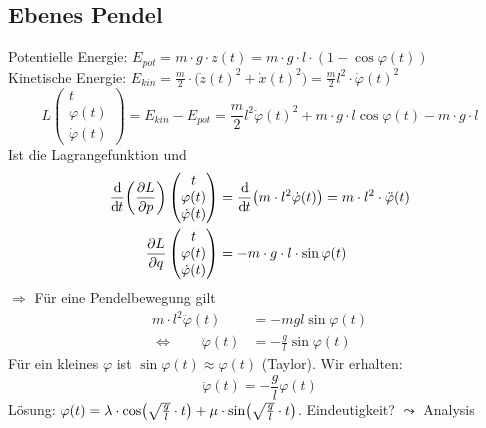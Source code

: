 \subsection{Ebenes Pendel} %
\label{sub:103}
\begin{figure}[h]
\end{figure}
Potentielle Energie: $E_{pot} = m \cdot g \cdot z(t) = m \cdot g \cdot l \cdot (1-\cos \varphi(t))$  \\
Kinetische Energie: $E_{kin} = \frac{m}{2} \cdot  \big( \dot z(t)^2 + \dot x(t)^2 \big) = \frac{m}{2} l^2 \cdot \dot \varphi(t)^2$
\[
	L \begin{pmatrix}
		t \\ \varphi(t) \\ \dot \varphi(t)
	\end{pmatrix} = E_{kin} - E_{pot} = \frac{m}{2} l^2 \dot \varphi(t)^2 + m \cdot g \cdot l \cos \varphi(t) - m \cdot g \cdot l
\]
Ist die Lagrangefunktion und 
\begin{align*}
	\diffd{}{t}  \enbrace*{ \diff{L}{p} } \begin{pmatrix}
		t \\ \varphi(t) \\ \dot \varphi(t)
	\end{pmatrix} &= \diffd{}{t} \enbrace*{m \cdot l ^2 \dot \varphi(t)} = m \cdot l^2 \cdot  \ddot \varphi(t) \\
	\diff{L}{q} \begin{pmatrix}
		t \\ \varphi(t) \\ \dot \varphi(t)
	\end{pmatrix} &= - m \cdot g \cdot l \cdot \sin \varphi(t)
\end{align*}
$\Rightarrow $ Für eine Pendelbewegung gilt 
\begin{align*}
	m \cdot l^2 \ddot \varphi (t) &= - m g l \sin \varphi(t) \\
	\Leftrightarrow \qquad \ddot \varphi(t) &= - \frac{g}{l} \sin \varphi(t) 
\end{align*}
Für ein kleines $\varphi$ ist $\sin \varphi(t) \approx \varphi(t)$ (Taylor). Wir erhalten:
\[
	\ddot \varphi(t) = - \frac{g}{l} \varphi(t) 
\]
Lösung: $\varphi(t) = \lambda \cdot \cos \enbrace*{\sqrt{\frac{g}{l} }\cdot t  } + \mu \cdot  \sin \enbrace*{\sqrt{\frac{g}{l} } \cdot t }  $. Eindeutigkeit? $\leadsto$
Analysis 

